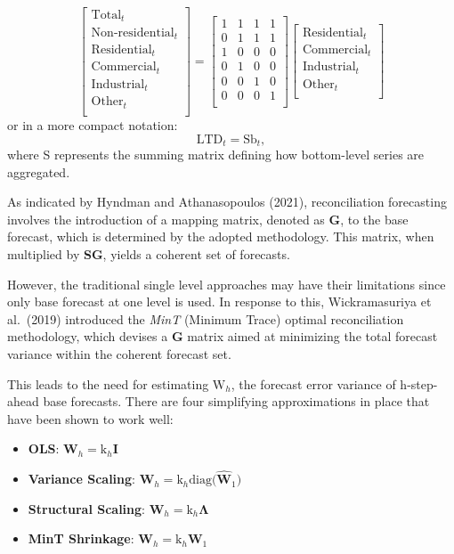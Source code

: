 \documentclass[11pt,a4paper,]{article}
\begin{document}
\[
\begin{bmatrix}
  \text{Total}_{t} \\
  \text{Non-residential}_{t} \\
  \text{Residential}_{t} \\
  \text{Commercial}_{t} \\
  \text{Industrial}_{t} \\
  \text{Other}_{t} \\
  \end{bmatrix}
=
\begin{bmatrix}
  1 & 1 & 1 & 1 \\
  0 & 1 & 1 & 1 \\
  1 & 0 & 0 & 0 \\
  0 & 1 & 0 & 0 \\
  0 & 0 & 1 & 0 \\
  0 & 0 & 0 & 1 \\
\end{bmatrix}
\begin{bmatrix}
  \text{Residential}_{t} \\
  \text{Commercial}_{t} \\
  \text{Industrial}_{t} \\
  \text{Other}_{t} \\
\end{bmatrix}
\]
or in a more compact notation:
\[
\text{LTD}_{t} = \text{S}\text{b}_{t},
\]
where S represents the summing matrix defining how bottom-level series are aggregated.

As indicated by Hyndman and Athanasopoulos (2021), reconciliation forecasting involves the introduction of a mapping matrix, denoted as \textbf{G}, to the base forecast, which is determined by the adopted methodology. This matrix, when multiplied by \textbf{SG}, yields a coherent set of forecasts.

However, the traditional single level approaches may have their limitations since only base forecast at one level is used. In response to this, Wickramasuriya et al.~(2019) introduced the \emph{MinT} (Minimum Trace) optimal reconciliation methodology, which devises a \textbf{G} matrix aimed at minimizing the total forecast variance within the coherent forecast set.

This leads to the need for estimating \(\text{W}_{h}\), the forecast error variance of h-step-ahead base forecasts. There are four simplifying approximations in place that have been shown to work well:

\begin{itemize}
\item
  \textbf{OLS}: \(\mathbf{W}_{h} = \text{k}_{h}\mathbf{I}\)
\item
  \textbf{Variance Scaling}: \(\mathbf{W}_{h} = \text{k}_{h}\text{diag(}\mathbf{\hat{W}}_{1}\text{)}\)
\item
  \textbf{Structural Scaling}: \(\mathbf{W}_{h} = \text{k}_{h}\mathbf{\Lambda}\)
\item
  \textbf{MinT Shrinkage}: \(\mathbf{W}_{h} = \text{k}_{h}\mathbf{W}_{1}\)
\end{itemize}
\end{document}

